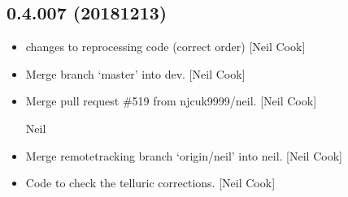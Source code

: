 \documentclass[a4paper,10pt,english]{report}
\begin{document}
\subsection{0.4.007 (2018\sphinxhyphen{}12\sphinxhyphen{}13)}
\label{\detokenize{misc/changelog:id255}}\begin{itemize}
\item {} 
 \sphinxhyphen{} changes to reprocessing code (correct order)
{[}Neil Cook{]}

\item {} 
Merge branch ‘master’ into dev. {[}Neil Cook{]}

\item {} 
Merge pull request \#519 from njcuk9999/neil. {[}Neil Cook{]}

Neil

\item {} 
Merge remote\sphinxhyphen{}tracking branch ‘origin/neil’ into neil. {[}Neil Cook{]}

\item {} 
Code to check the telluric corrections. {[}Neil Cook{]}

\end{itemize}
\end{document}
